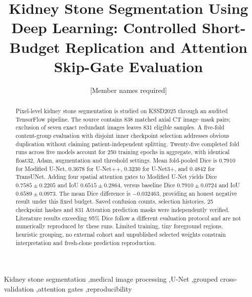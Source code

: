 \documentclass[a4paper,fleqn]{cas-sc}
\begin{document}
\let\WriteBookmarks\relax
{}
\title[mode=title]{Kidney Stone Segmentation Using Deep Learning: Controlled Short-Budget Replication and Attention Skip-Gate Evaluation}
\tnotemark[1]
\author[1]{[Member names required]}
\begin{abstract}
Pixel-level kidney stone segmentation is studied on KSSD2025 through an audited TensorFlow pipeline. The source contains 838 matched axial CT image--mask pairs; exclusion of seven exact redundant images leaves 831 eligible samples. A five-fold content-group evaluation with disjoint inner checkpoint selection addresses obvious duplication without claiming patient-independent splitting. Twenty-five completed fold runs across five models account for 250 training epochs in aggregate, with identical float32, Adam, augmentation and threshold settings. Mean fold-pooled Dice is 0.7910 for Modified U-Net, 0.3678 for U-Net++, 0.3230 for U-Net3+, and 0.4842 for TransUNet. Adding four spatial attention gates to Modified U-Net yields Dice $0.7585\pm0.2205$ and IoU $0.6515\pm0.2864$, versus baseline Dice $0.7910\pm0.0724$ and IoU $0.6589\pm0.0973$. The mean Dice difference is $-0.032463$, providing an honest negative result under this fixed budget. Saved confusion counts, selection histories, 25 checkpoint hashes and 831 Attention prediction masks were independently verified. Literature results exceeding 95\% Dice follow a different evaluation protocol and are not numerically reproduced by these runs. Limited training, tiny foreground regions, heuristic grouping, no external cohort and unpublished selected weights constrain interpretation and fresh-clone prediction reproduction.
\end{abstract}
\begin{keywords}
Kidney stone segmentation \sep medical image processing \sep U-Net \sep grouped cross-validation \sep attention gates \sep reproducibility
\end{keywords}
\maketitle
\end{document}
